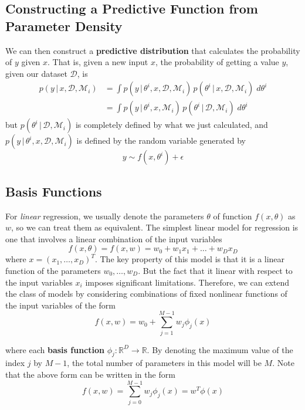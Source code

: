 \documentclass{article}
\begin{document}
  \subsection{Constructing a Predictive Function from Parameter Density}

    We can then construct a \textbf{predictive distribution} that calculates the probability of $y$ given $x$. That is, given a new input $x$, the probability of getting a value $y$, given our dataset $\mathcal{D}$, is
    \begin{align*}
      p(y\,|\,x, \mathcal{D}, \mathcal{M}_i) & = \int p(y\,|\,\theta^i, x, \mathcal{D}, \mathcal{M}_i) \, p(\theta^i \,|\, x, \mathcal{D}, \mathcal{M}_i)\; d\theta^i \\
      & = \int p(y\,|\,\theta^i, x, \mathcal{M}_i)\, p(\theta^i \,|\,\mathcal{D}, \mathcal{M}_i)\; d\theta^i
    \end{align*}
    but $p(\theta^i\,|\,\mathcal{D}, \mathcal{M}_i)$ is completely defined by what we just calculated, and $p(y\,|\,\theta^i, x, \mathcal{D}, \mathcal{M}_i)$ is defined by the random variable generated by
    \begin{equation}
      y \sim f(x, \theta^i) + \epsilon
    \end{equation}

  \subsection{Basis Functions}

    For \textit{linear} regression, we usually denote the parameters $\theta$ of function $f(x, \theta)$ as $w$, so we can treat them as equivalent. The simplest linear model for regression is one that involves a linear combination of the input variables
    \begin{equation}
      f(x, \theta) = f(x, w) = w_0 + w_1 x_1 + \ldots + w_D x_D
    \end{equation}
    where $x = (x_1, \ldots, x_D)^T$. The key property of this model is that it is a linear function of the parameters $w_0, \ldots, w_D$. But the fact that it linear with respect to the input variables $x_i$ imposes significant limitations. Therefore, we can extend the class of models by considering combinations of fixed nonlinear functions of the input variables of the form
    \begin{equation}
      f(x, w) = w_0 + \sum_{j=1}^{M-1} w_j \phi_j (x)
    \end{equation}

    where each \textbf{basis function} $\phi_j: \mathbb{R}^D \longrightarrow \mathbb{R}$. By denoting the maximum value of the index $j$ by $M-1$, the total number of parameters in this model will be $M$. Note that the above form can be written in the form
    \begin{equation}
      f(x, w) = \sum_{j=0}^{M-1} w_j \phi_j (x) = w^T \phi(x)
    \end{equation}
\end{document}
